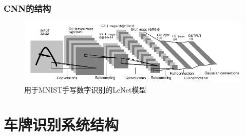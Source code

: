 \documentclass[UTF8]{beamer}
\begin{document}
\begin{frame}
  \frametitle{CNN的结构}

  \begin{figure}[ht]
    \includegraphics[width=1.0\linewidth]{./Figure/LeNet.png}
    \caption{用于MNIST手写数字识别的LeNet模型}
  \end{figure}
\end{frame}
  
\section{车牌识别系统结构}
\end{document}
